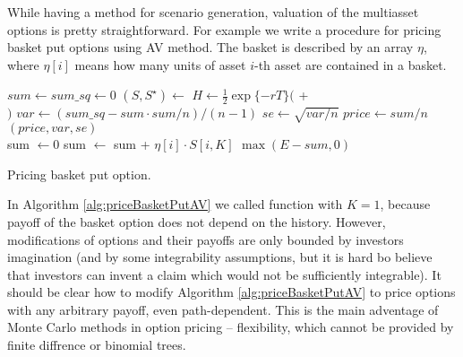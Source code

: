 \documentclass[a4paper,11pt, twoside]{book}
\theoremstyle{definition}
\theoremstyle{remark}
\begin{document}
While having a method for scenario generation, valuation of the multiasset options is pretty straightforward. For example we write a procedure for pricing basket put options using AV method. The basket is described by an array $\eta$, where $\eta[i]$ means how many units of asset $i$-th asset are contained in a basket.

\begin{algorithm}
 \begin{algorithmic}[1]
  \State  $sum \gets sum\_sq \gets 0$
    \State $(S, S^\star) \gets$ 
    \State $H \gets \frac{1}{2}\exp\{-rT\} ($  +\\ 
    \hspace{132pt}  $)$
  \EndFor
  \State $var \gets (sum\_sq - sum \cdot sum/n) / (n-1)$
  \State $se \gets \sqrt{var / n}$
  \State $price \gets sum / n$
  \State \Return $(price, var, se)$
  \EndFunction
  \\
    \State sum $\gets 0$
      \State sum $\gets$ sum + $\eta[i]\cdot S[i, K]$
    \EndFor
    \State \Return $\max(E - sum, 0)$
  \EndFunction
 \end{algorithmic}
 \caption{Pricing basket put option.}
 \label{alg:priceBasketPutAV}
\end{algorithm}


In Algorithm \ref{alg:priceBasketPutAV} we called function  with $K=1$, because payoff of the basket option does not depend on the history. However, modifications of options and their payoffs are only bounded by investors imagination (and by some integrability assumptions, but it is hard bo believe that investors can invent a claim which would not be sufficiently integrable).
It should be clear how to modify Algorithm \ref{alg:priceBasketPutAV} to price options with any arbitrary payoff, even path-dependent. This is the main adventage of Monte Carlo methods in option pricing -- flexibility, which cannot be provided by finite diffrence or binomial trees.
\end{document}
